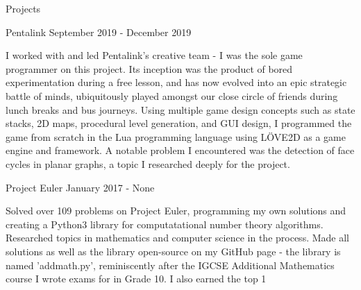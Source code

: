 \documentclass{resume} %
\begin{document}
\begin{rSection}{Projects}


\begin{rSubsection}{ Pentalink }{ September 2019 - December 2019 }{}
\item I worked with and led Pentalink's creative team - I was the sole game programmer on this project. Its inception was the product of bored experimentation during a free lesson, and has now evolved into an epic strategic battle of minds, ubiquitously played amongst our close circle of friends during lunch breaks and bus journeys. Using multiple game design concepts such as state stacks, 2D maps, procedural level generation, and GUI design, I programmed the game from scratch in the Lua programming language using LÖVE2D as a game engine and framework. A notable problem I encountered was the detection of face cycles in planar graphs, a topic I researched deeply for the project.

\end{rSubsection}



\begin{rSubsection}{ Project Euler }{ January 2017 - None }{}
\item Solved over 109 problems on Project Euler, programming my own solutions and creating a Python3 library for computatational number theory algorithms. Researched topics in mathematics and computer science in the process. Made all solutions as well as the library open-source on my GitHub page - the library is named 'addmath.py', reminiscently after the IGCSE Additional Mathematics course I wrote exams for in Grade 10. I also earned the top 1%

\end{rSubsection}




\end{rSection}
\end{document}

